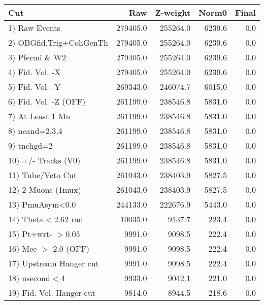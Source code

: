 \begin{table}[h!]\centering
 \begin{tabular}{||l||r|r|r|r||}
 \hline
 \hline
 Cut & Raw & Z-weight & Norm0 & Final \\
 \hline
  1) Raw Events           &    279405.0 &    255264.0 &      6239.6 &         0.0 \\
  2) OBGfid,Trig+CohGenTh &    279405.0 &    255264.0 &      6239.6 &         0.0 \\
  3) Pfermi \& W2         &    279405.0 &    255264.0 &      6239.6 &         0.0 \\
  4) Fid. Vol. -X         &    279405.0 &    255264.0 &      6239.6 &         0.0 \\
  5) Fid. Vol. -Y         &    269343.0 &    246074.7 &      6015.0 &         0.0 \\
  6) Fid. Vol. -Z (OFF)   &    261199.0 &    238546.8 &      5831.0 &         0.0 \\
  7) At Least 1 Mu        &    261199.0 &    238546.8 &      5831.0 &         0.0 \\
  8) ncand=2,3,4          &    261199.0 &    238546.8 &      5831.0 &         0.0 \\
  9) tnchgd=2             &    261199.0 &    238546.8 &      5831.0 &         0.0 \\
 10) +/- Tracks (V0)      &    261199.0 &    238546.8 &      5831.0 &         0.0 \\
 11) Tube/Veto Cut        &    261043.0 &    238403.9 &      5827.5 &         0.0 \\
 12) 2 Muons (1mux)       &    261043.0 &    238403.9 &      5827.5 &         0.0 \\
 13) PmuAsym<0.0          &    244133.0 &    222676.9 &      5443.0 &         0.0 \\
 14) Theta$<$2.62 rad     &     10035.0 &      9137.7 &       223.4 &         0.0 \\
 15) Pt+wrt- $>$0.05      &      9991.0 &      9098.5 &       222.4 &         0.0 \\
 16) Mee $>$ 2.0  (OFF)   &      9991.0 &      9098.5 &       222.4 &         0.0 \\
 17) Upstream Hanger cut  &      9991.0 &      9098.5 &       222.4 &         0.0 \\
 18) nsecond$<$4          &      9933.0 &      9042.1 &       221.0 &         0.0 \\
 19) Fid. Vol. Hanger cut &      9814.0 &      8944.5 &       218.6 &         0.0 \\

\end{tabular}
\end{table}

